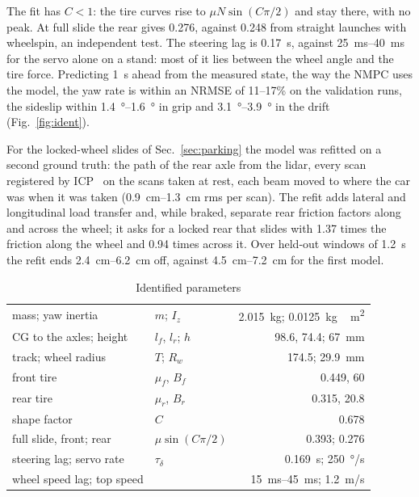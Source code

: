 \documentclass[conference]{IEEEtran}
\begin{document}
The fit has $C < 1$: the tire curves rise to $\mu N \sin(C\pi/2)$ and stay there, with no peak. At full slide the
rear gives 0.276, against 0.248 from straight launches with wheelspin, an independent test. The steering lag is
\SI{0.17}{s}, against \SIrange{25}{40}{ms} for the servo alone on a stand: most of it lies between the wheel angle and
the tire force. Predicting \SI{1}{s} ahead from the measured state, the way the NMPC uses the model, the yaw rate is
within an NRMSE of 11--17\% on the validation runs, the sideslip within \SIrange{1.4}{1.6}{\degree} in grip and
\SIrange{3.1}{3.9}{\degree} in the drift (Fig.~\ref{fig:ident}).

For the locked-wheel slides of Sec.~\ref{sec:parking} the model was refitted on a second ground truth: the path of
the rear axle from the lidar, every scan registered by ICP~\cite{besl1992} on the scans taken at rest, each beam
moved to where the car was when it was taken (\SIrange{0.9}{1.3}{cm} rms per scan). The refit adds lateral and
longitudinal load transfer and, while braked, separate rear friction factors along and across the wheel; it asks
for a locked rear that slides with 1.37 times the friction along the wheel and 0.94 times across it. Over
held-out windows of \SI{1.2}{s} the refit ends \SIrange{2.4}{6.2}{cm} off, against \SIrange{4.5}{7.2}{cm} for the
first model.

\begin{table}[t]
\caption{Identified parameters}
\label{tab:params}
\centering
\footnotesize
\begin{tabular}{@{}llr@{}}
\toprule
mass; yaw inertia & $m$; $I_z$ & \SI{2.015}{kg}; \SI{0.0125}{kg\,m^2} \\
CG to the axles; height & $l_f$, $l_r$; $h$ & 98.6, 74.4; \SI{67}{mm} \\
track; wheel radius & $T$; $R_w$ & 174.5; \SI{29.9}{mm} \\
front tire & $\mu_f$, $B_f$ & 0.449, 60 \\
rear tire & $\mu_r$, $B_r$ & 0.315, 20.8 \\
shape factor & $C$ & 0.678 \\
full slide, front; rear & $\mu \sin(C\pi/2)$ & 0.393; 0.276 \\
steering lag; servo rate & $\tau_\delta$ & \SI{0.169}{s}; \SI{250}{\degree/s} \\
wheel speed lag; top speed & & \SIrange{15}{45}{ms}; \SI{1.2}{m/s} \\
\bottomrule
\end{tabular}
\end{table}
\end{document}
